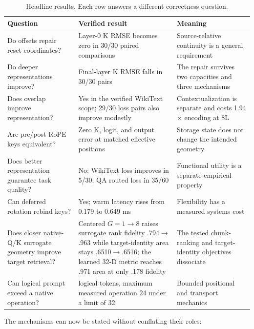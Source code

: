 \documentclass[11pt]{article}
\begin{document}
\begin{table}[H]
\centering
\small
\caption{Headline results. Each row answers a different correctness question.}
\label{tab:headline}
\begin{tabularx}{\textwidth}{>{\raggedright\arraybackslash}X>{\raggedright\arraybackslash}X>{\raggedright\arraybackslash}X}
\toprule
Question & Verified result & Meaning \\
\midrule
Do offsets repair reset coordinates? & Layer-0 K RMSE becomes zero in 30/30 paired comparisons & Source-relative continuity is a general requirement \\
Do deeper representations improve? & Final-layer K RMSE falls in 30/30 pairs & The repair survives two capacities and three mechanisms \\
Does overlap improve representation? & Yes in the verified WikiText scope; 29/30 loss pairs also improve modestly & Contextualization is separate and costs 1.94$\times$ encoding at 8L \\
Are pre/post RoPE keys equivalent? & Zero K, logit, and output error at matched effective positions & Storage state does not change the intended geometry \\
Does better representation guarantee task quality? & No: WikiText loss improves in 5/30; QA routed loss in 35/60 & Functional utility is a separate empirical property \\
Can deferred rotation rebind keys? & Yes; warm latency rises from 0.179 to 0.649 ms & Flexibility has a measured systems cost \\
Does closer native-Q/K surrogate geometry improve target retrieval? & Centered $G=1\rightarrow8$ raises surrogate rank fidelity .794$\rightarrow$.963 while target-identity area stays .6510$\rightarrow$.6516; the learned 32-D metric reaches .971 area at only .178 fidelity & The tested chunk-ranking and target-identity objectives dissociate \\
Can logical prompt exceed a native operation? & 192 logical tokens, maximum measured operation 24 under a limit of 32 & Bounded positional and transport mechanics \\
\bottomrule
\end{tabularx}
\end{table}

The mechanisms can now be stated without conflating their roles:
\end{document}
